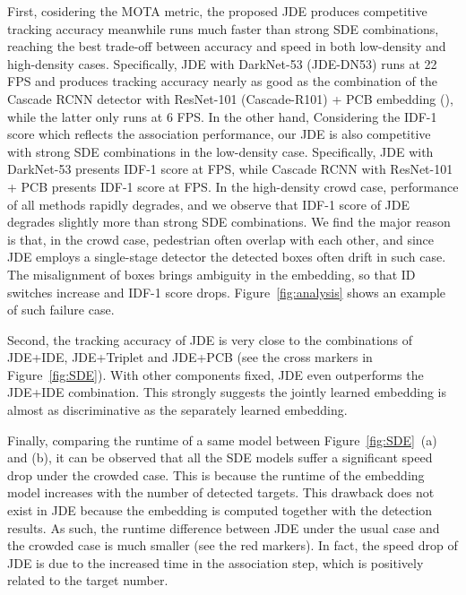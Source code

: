 \documentclass[runningheads]{llncs}
\begin{document}
First, cosidering the MOTA metric, the proposed JDE produces competitive tracking accuracy meanwhile runs much faster than strong SDE combinations, reaching the best trade-off between accuracy and speed in both low-density and high-density cases. Specifically, JDE with DarkNet-53 (JDE-DN53) runs at 22 FPS and produces tracking accuracy nearly as good as the combination of the Cascade RCNN detector with ResNet-101 (Cascade-R101) + PCB embedding (), while the latter only runs at 6 FPS. In the other hand, Considering the IDF-1 score which reflects the association performance, our JDE is also competitive with strong SDE combinations in the low-density case. Specifically, JDE with DarkNet-53 presents  IDF-1 score at  FPS, while Cascade RCNN with ResNet-101 + PCB presents  IDF-1 score at  FPS. In the high-density crowd case, performance of all methods rapidly degrades, and we observe that IDF-1 score of JDE degrades slightly more than strong SDE combinations. We find the major reason is that, in the crowd case, pedestrian often overlap with each other, and since JDE employs a single-stage detector the detected boxes often drift in such case. The misalignment of boxes brings ambiguity in the embedding, so that ID switches increase and IDF-1 score drops. Figure~\ref{fig:analysis} shows an example of such failure case.

Second, the tracking accuracy of JDE is very close to the combinations of JDE+IDE, JDE+Triplet and JDE+PCB  (see the cross markers in Figure~\ref{fig:SDE}). With other components fixed, JDE even outperforms the JDE+IDE combination. This strongly suggests the jointly learned embedding is almost as discriminative as the separately learned embedding. 

Finally, comparing the runtime of a same model between Figure~\ref{fig:SDE}~(a) and (b), it can be observed that all the SDE models suffer a significant speed drop under the crowded case. This is because the runtime of the embedding model increases with the number of detected targets. This drawback does not exist in JDE because the embedding is computed together with the detection results. As such, the runtime difference between JDE under the usual case and the crowded case is much smaller (see the red markers). In fact, the speed drop of JDE is due to the increased time in the association step, which is positively related to the target number.
\end{document}
